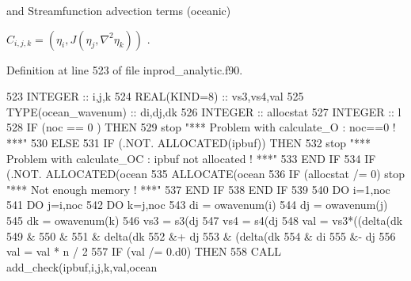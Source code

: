 and Streamfunction advection terms (oceanic)

$ C_{i,j,k} = (\eta_i, J(\eta_j,\nabla^2 \eta_k))$ . 

Definition at line 523 of file inprod\+\_\+analytic.\+f90.


\begin{DoxyCode}
523     \textcolor{keywordtype}{INTEGER} :: i,j,k
524     \textcolor{keywordtype}{REAL(KIND=8)} :: vs3,vs4,val
525     \textcolor{keywordtype}{TYPE}(ocean\_wavenum) :: di,dj,dk
526     \textcolor{keywordtype}{INTEGER} :: allocstat
527     \textcolor{keywordtype}{INTEGER} :: l
528     \textcolor{keywordflow}{IF} (noc == 0 ) \textcolor{keywordflow}{THEN}
529        stop \textcolor{stringliteral}{"*** Problem with calculate\_O : noc==0 ! ***"}
530     \textcolor{keywordflow}{ELSE}
531        \textcolor{keywordflow}{IF} (.NOT. \textcolor{keyword}{ALLOCATED}(ipbuf)) \textcolor{keywordflow}{THEN}
532           stop \textcolor{stringliteral}{"*** Problem with calculate\_OC : ipbuf not allocated ! ***"}
533 \textcolor{keywordflow}{       END IF}
534        \textcolor{keywordflow}{IF} (.NOT. \textcolor{keyword}{ALLOCATED}(ocean%
535           \textcolor{keyword}{ALLOCATE}(ocean%
536           \textcolor{keywordflow}{IF} (allocstat /= 0) stop \textcolor{stringliteral}{"*** Not enough memory ! ***"}
537 \textcolor{keywordflow}{       END IF}
538 \textcolor{keywordflow}{    END IF}
539 
540     \textcolor{keywordflow}{DO} i=1,noc
541        \textcolor{keywordflow}{DO} j=i,noc
542           \textcolor{keywordflow}{DO} k=j,noc
543              di = owavenum(i)
544              dj = owavenum(j)
545              dk = owavenum(k)
546              vs3 = s3(dj%
547              vs4 = s4(dj%
548              val = vs3*((delta(dk%
549                   &%
550                   &%
551                   & delta(dk%
552                   &+ dj%
553                   & (delta(dk%
554                   & di%
555                   &- dj%
556              val = val * n / 2
557              \textcolor{keywordflow}{IF} (val /= 0.d0) \textcolor{keywordflow}{THEN}
558                 \textcolor{keyword}{CALL }add\_check(ipbuf,i,j,k,val,ocean%

\end{DoxyCode}
